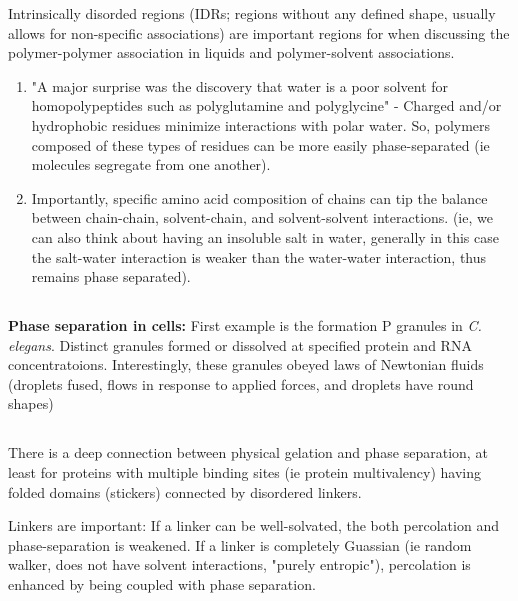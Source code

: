 \documentclass{article}
\begin{document}
Intrinsically disorded regions (IDRs; regions without any defined shape, usually allows for non-specific associations) are important regions for when discussing the polymer-polymer association in liquids and polymer-solvent associations.

\begin{enumerate}
    \item "A major surprise was the discovery that water is a poor solvent for homopolypeptides such as polyglutamine and polyglycine" - Charged and/or hydrophobic residues minimize interactions with polar water. So, polymers composed of these types of residues can be more easily phase-separated (ie molecules segregate from one another).
    \item Importantly, specific amino acid composition of chains can tip the balance between chain-chain, solvent-chain, and solvent-solvent interactions. (ie, we can also think about having an insoluble salt in water, generally in this case the salt-water interaction is weaker than the water-water interaction, thus remains phase separated).
\end{enumerate}

\subsection{}

\textbf{Phase separation in cells: } First example is the formation P granules in \textit{C. elegans}. Distinct granules formed or dissolved at specified protein and RNA concentratoions. Interestingly, these granules obeyed laws of Newtonian fluids (droplets fused, flows in response to applied forces, and droplets have round shapes)

\subsection{}

There is a deep connection between physical gelation and phase separation, at least for proteins with multiple binding sites (ie protein multivalency) having folded domains (stickers) connected by disordered linkers.

Linkers are important: If a linker can be well-solvated, the both percolation and phase-separation is weakened. If a linker is completely Guassian (ie random walker, does not have solvent interactions, "purely entropic"), percolation is enhanced by being coupled with phase separation.

\subsection{}
\end{document}
